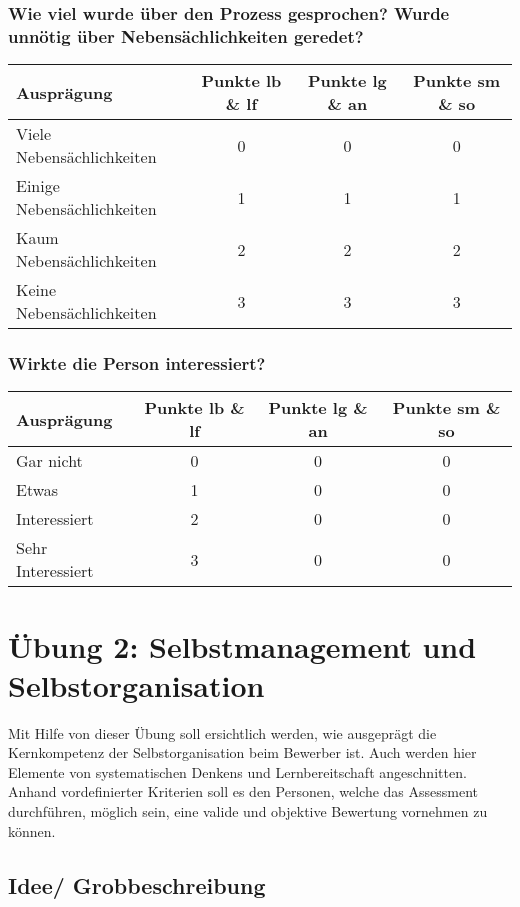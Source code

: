 \subsubsection{Wie viel wurde über den Prozess gesprochen? Wurde unnötig über Nebensächlichkeiten geredet?}
\begin{tabular}{| l | c | c | c |}
  \hline	
  \textbf{Ausprägung} & \textbf{Punkte lb \& lf} & \textbf{Punkte lg \& an} & \textbf{Punkte sm \& so} \\
  \hline  		
  Viele Nebensächlichkeiten & 0  & 0 & 0 \\ 
  \hline
  Einige Nebensächlichkeiten & 1 & 1 & 1 \\ 
  \hline
  Kaum Nebensächlichkeiten & 2 & 2 & 2 \\
  \hline  
  Keine Nebensächlichkeiten & 3 & 3 & 3 \\
  \hline  
\end{tabular}

\subsubsection{Wirkte die Person interessiert?}
\begin{tabular}{| l | c | c | c |}
  \hline	
  \textbf{Ausprägung} & \textbf{Punkte lb \& lf} & \textbf{Punkte lg \& an} & \textbf{Punkte sm \& so} \\
  \hline  		
  Gar nicht & 0  & 0 & 0 \\ 
  \hline
  Etwas & 1 & 0 & 0 \\ 
  \hline
  Interessiert & 2 & 0 & 0 \\
  \hline  
  Sehr Interessiert & 3 & 0 & 0 \\
  \hline  
\end{tabular}



\section{Übung 2: Selbstmanagement und Selbstorganisation}

Mit Hilfe von dieser Übung soll ersichtlich werden, wie ausgeprägt die Kernkompetenz der Selbstorganisation beim Bewerber ist. Auch werden hier Elemente von systematischen Denkens und Lernbereitschaft angeschnitten. Anhand vordefinierter Kriterien soll es den Personen, welche das Assessment durchführen, möglich sein, eine valide und objektive Bewertung vornehmen zu können.

\subsection{Idee/ Grobbeschreibung}


